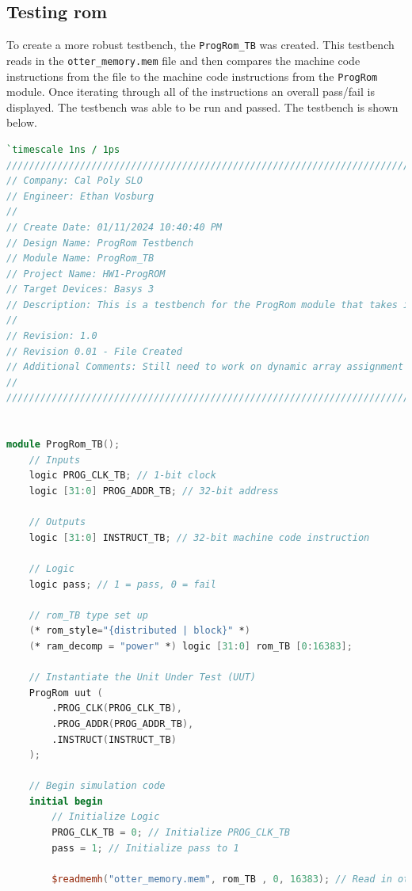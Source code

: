 \documentclass[
    a4paper, %
	12pt, %
    ]{CSSullivanBusinessReport}
\begin{document}
\begin{fullwidth}
\section{Testing rom} %

To create a more robust testbench, the \verb|ProgRom_TB| was created. This testbench reads in the \verb|otter_memory.mem| file and then compares the machine code instructions from the file to the machine code instructions from the \verb|ProgRom| module. Once iterating through all of the instructions an overall pass/fail is displayed. The testbench was able to be run and passed. The testbench is shown below.

\begin{lstlisting}[language=Verilog, caption=Assembly instructions from reverse engineered file]
`timescale 1ns / 1ps
//////////////////////////////////////////////////////////////////////////////////
// Company: Cal Poly SLO
// Engineer: Ethan Vosburg
// 
// Create Date: 01/11/2024 10:40:40 PM
// Design Name: ProgRom Testbench
// Module Name: ProgRom_TB
// Project Name: HW1-ProgROM
// Target Devices: Basys 3
// Description: This is a testbench for the ProgRom module that takes in a mem file and checks that the program memory is correct
// 
// Revision: 1.0
// Revision 0.01 - File Created
// Additional Comments: Still need to work on dynamic array assignment
// 
//////////////////////////////////////////////////////////////////////////////////


module ProgRom_TB();
    // Inputs
    logic PROG_CLK_TB; // 1-bit clock
    logic [31:0] PROG_ADDR_TB; // 32-bit address

    // Outputs
    logic [31:0] INSTRUCT_TB; // 32-bit machine code instruction

    // Logic
    logic pass; // 1 = pass, 0 = fail

    // rom_TB type set up
    (* rom_style="{distributed | block}" *)
	(* ram_decomp = "power" *) logic [31:0] rom_TB [0:16383];

    // Instantiate the Unit Under Test (UUT)
    ProgRom uut (
        .PROG_CLK(PROG_CLK_TB), 
        .PROG_ADDR(PROG_ADDR_TB), 
        .INSTRUCT(INSTRUCT_TB)
    );

    // Begin simulation code
    initial begin
        // Initialize Logic
        PROG_CLK_TB = 0; // Initialize PROG_CLK_TB
        pass = 1; // Initialize pass to 1
        
        $readmemh("otter_memory.mem", rom_TB , 0, 16383); // Read in otter_memory.mem file


\end{lstlisting}
\end{fullwidth}
\end{document}
